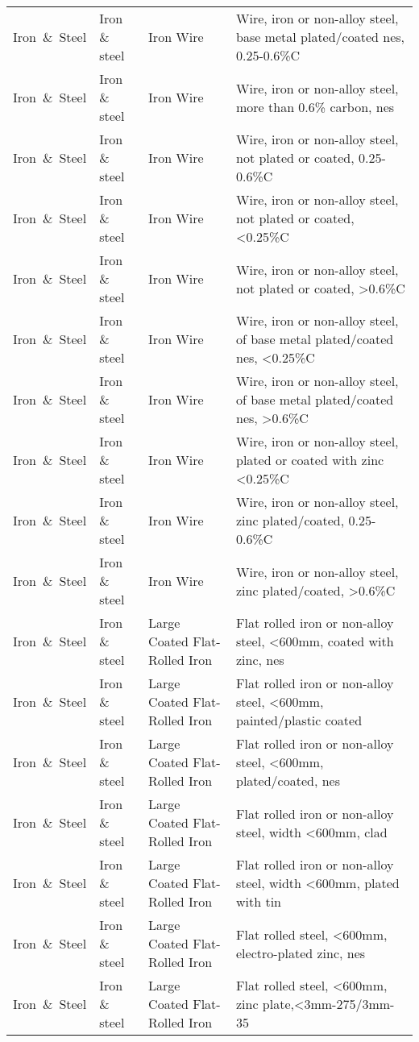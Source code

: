 \begin{appendices}
\begin{xltabular}{\textwidth}{|p{0.07\textwidth}|p{0.12\textwidth}|p{0.20\textwidth}|p{0.5\textwidth}|}
Iron\ \&\ Steel & Iron \& steel & Iron Wire & Wire, iron or non-alloy steel, base metal plated/coated nes, 0.25-0.6\%C \\
Iron\ \&\ Steel & Iron \& steel & Iron Wire & Wire, iron or non-alloy steel, more than 0.6\% carbon, nes \\
Iron\ \&\ Steel & Iron \& steel & Iron Wire & Wire, iron or non-alloy steel, not plated or coated, 0.25-0.6\%C \\
Iron\ \&\ Steel & Iron \& steel & Iron Wire & Wire, iron or non-alloy steel, not plated or coated, <0.25\%C \\
Iron\ \&\ Steel & Iron \& steel & Iron Wire & Wire, iron or non-alloy steel, not plated or coated, >0.6\%C \\
Iron\ \&\ Steel & Iron \& steel & Iron Wire & Wire, iron or non-alloy steel, of base metal plated/coated nes, <0.25\%C \\
Iron\ \&\ Steel & Iron \& steel & Iron Wire & Wire, iron or non-alloy steel, of base metal plated/coated nes, >0.6\%C \\
Iron\ \&\ Steel & Iron \& steel & Iron Wire & Wire, iron or non-alloy steel, plated or coated with zinc <0.25\%C \\
Iron\ \&\ Steel & Iron \& steel & Iron Wire & Wire, iron or non-alloy steel, zinc plated/coated, 0.25-0.6\%C \\
Iron\ \&\ Steel & Iron \& steel & Iron Wire & Wire, iron or non-alloy steel, zinc plated/coated, >0.6\%C \\
Iron\ \&\ Steel & Iron \& steel & Large Coated Flat-Rolled Iron & Flat rolled iron or non-alloy steel, <600mm, coated with zinc, nes \\
Iron\ \&\ Steel & Iron \& steel & Large Coated Flat-Rolled Iron & Flat rolled iron or non-alloy steel, <600mm, painted/plastic coated \\
Iron\ \&\ Steel & Iron \& steel & Large Coated Flat-Rolled Iron & Flat rolled iron or non-alloy steel, <600mm, plated/coated, nes \\
Iron\ \&\ Steel & Iron \& steel & Large Coated Flat-Rolled Iron & Flat rolled iron or non-alloy steel, width <600mm, clad \\
Iron\ \&\ Steel & Iron \& steel & Large Coated Flat-Rolled Iron & Flat rolled iron or non-alloy steel, width <600mm, plated with tin \\
Iron\ \&\ Steel & Iron \& steel & Large Coated Flat-Rolled Iron & Flat rolled steel, <600mm, electro-plated zinc, nes \\
Iron\ \&\ Steel & Iron \& steel & Large Coated Flat-Rolled Iron & Flat rolled steel, <600mm, zinc plate,<3mm-275/3mm-35 \\

\end{xltabular}
\end{appendices}
